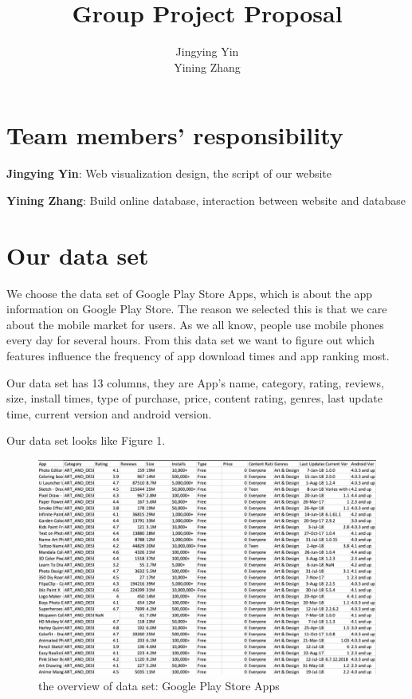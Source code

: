 \documentclass[12pt]{article}
\begin{document}
 
 
\title{Group Project Proposal}
\author{Jingying Yin\\ %
Yining Zhang}
\maketitle
\section{Team members' responsibility}
\textbf{Jingying Yin}:
	Web visualization design, the script of our website

\textbf{Yining Zhang}:
	Build online database, interaction between website and database
\section{Our data set}
We choose the data set of Google Play Store Apps, which is about the app information on Google Play Store. The reason we selected this is that we care about the mobile market for users. As we all know, people use mobile phones every day for several hours. From this data set we want to figure out which features influence the frequency of app download times and app ranking most.

Our data set has 13 columns, they are App’s name, category, rating, reviews, size, install times, type of purchase, price, content rating, genres, last update time, current version and android version.

Our data set looks like Figure 1.

\begin{figure}[H]
\centering
\includegraphics[scale=0.55]{Images/Picture1.png} 
\caption{the overview of data set: Google Play Store Apps}
\label{picture1}
\end{figure}
\end{document}

